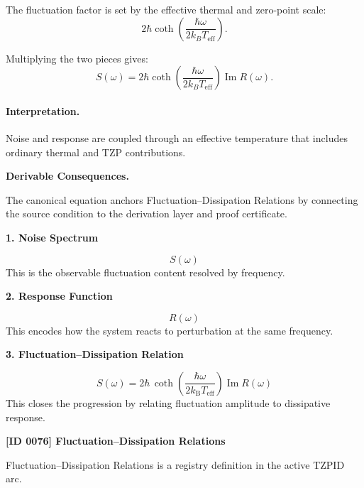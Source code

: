 The fluctuation factor is set by the effective thermal and zero-point scale:
\begin{equation}
2\hbar
\coth\left(
\frac{\hbar\omega}{2k_B T_{\mathrm{eff}}}
\right).
\end{equation}

Multiplying the two pieces gives:
\begin{equation}
\boxed{
S(\omega)
=
2\hbar
\coth\left(
\frac{\hbar\omega}{2k_B T_{\mathrm{eff}}}
\right)
\operatorname{Im}R(\omega).
}
\end{equation}

\paragraph{Interpretation.}
Noise and response are coupled through an effective temperature that includes ordinary thermal and TZP contributions.

\par\vspace{0.35em}
\noindent\textbf{Derivable Consequences.}\quad
\begingroup
\footnotesize
\raggedright
The canonical equation anchors Fluctuation--Dissipation Relations by connecting the source condition to the derivation layer and proof certificate.
\par\endgroup

\noindent\textbf{1. Noise Spectrum}\par
\[
S(\omega)
\]
\noindent This is the observable fluctuation content resolved by frequency.\par
\noindent\textbf{2. Response Function}\par
\[
R(\omega)
\]
\noindent This encodes how the system reacts to perturbation at the same frequency.\par
\noindent\textbf{3. Fluctuation--Dissipation Relation}\par
\[
S(\omega)
=
2\hbar\,
\coth\!\left(
\frac{\hbar\omega}{2k_{\mathrm{B}}T_{\mathrm{eff}}}
\right)
\operatorname{Im}R(\omega)
\]
\noindent This closes the progression by relating fluctuation amplitude to dissipative response.\par

\clearpage
\noindent\textbf{[ID 0076] Fluctuation--Dissipation Relations}\par
\vspace{0.35em}
\begingroup\small
{}
Fluctuation--Dissipation Relations is a registry definition in the active TZPID arc.

